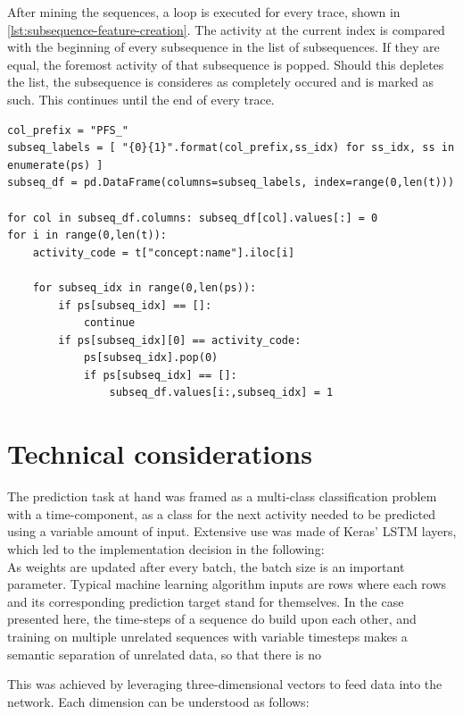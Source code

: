 After mining the sequences, a loop is executed for every trace, shown in \autoref{lst:subsequence-feature-creation}. The activity at the current index is compared with the beginning of every subsequence in the list of subsequences. If they are equal, the foremost activity of that subsequence is popped. Should this depletes the list, the subsequence is consideres as completely occured and is marked as such. This continues until the end of every trace.

\begin{lstlisting}[caption={Creating the subsequence features.}, label={lst:subsequence-feature-creation}]
col_prefix = "PFS_"
subseq_labels = [ "{0}{1}".format(col_prefix,ss_idx) for ss_idx, ss in enumerate(ps) ]
subseq_df = pd.DataFrame(columns=subseq_labels, index=range(0,len(t)))

for col in subseq_df.columns: subseq_df[col].values[:] = 0
for i in range(0,len(t)):
    activity_code = t["concept:name"].iloc[i]
    
    for subseq_idx in range(0,len(ps)):
        if ps[subseq_idx] == []:
            continue
        if ps[subseq_idx][0] == activity_code:
            ps[subseq_idx].pop(0)
            if ps[subseq_idx] == []:
                subseq_df.values[i:,subseq_idx] = 1
\end{lstlisting}


\section{Technical considerations}
The prediction task at hand was framed as a multi-class classification problem with a time-component, as a class for the next activity needed to be predicted using a variable amount of input. Extensive use was made of Keras' LSTM layers, which led to the implementation decision in the following:\\

As weights are updated after every batch, the batch size is an important parameter. Typical machine learning algorithm inputs are rows where each rows and its corresponding prediction target stand for themselves. In the case presented here, the time-steps of a sequence do build upon each other, and training on multiple unrelated sequences with variable timesteps makes a semantic separation of unrelated data, so that there is no

This was achieved by leveraging three-dimensional vectors to feed data into the network. Each dimension can be understood as follows:

